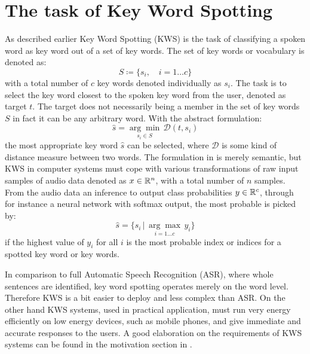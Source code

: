 
\section{The task of Key Word Spotting}\label{sec:intro_kws}
As described earlier Key Word Spotting (KWS) is the task of classifying a spoken word as key word out of a set of key words.
The set of key words or vocabulary is denoted as:
\begin{equation}\label{eq:intro_kws_dict}
	S \coloneqq \{s_i, \quad i=1 \dots c\}
\end{equation}
with a total number of $c$ key words denoted individually as $s_i$.
The task is to select the key word closest to the spoken key word from the user, denoted as target $t$.
The target does not necessarily being a member in the set of key words $S$ in fact it can be any arbitrary word.
With the abstract formulation:
\begin{equation}\label{eq:intro_kws_task}
	\hat{s} = \underset{s_i \in S}{\arg \min} \, \mathcal{D}(t, s_i)
\end{equation}
the most appropriate key word $\hat{s}$ can be selected, where $\mathcal{D}$ is some kind of distance measure between two words.
The formulation in  is merely semantic, but KWS in computer systems must cope with various transformations of raw input samples of audio data denoted as $x \in \mathbb{R}^n$, with a total number of $n$ samples.
From the audio data an inference to output class probabilities $y \in \mathbb{R}^c$, through for instance a neural network with softmax output, the most probable is picked by:
\begin{equation}\label{eq:intro_kws_class}
	\hat{s} = \{s_i \, | \, \underset{i = 1 \dots c}{\arg \max} \, y_i\}
\end{equation}
if the highest value of $y_i$ for all $i$ is the most probable index or indices for a spotted key word or key words.

In comparison to full Automatic Speech Recognition (ASR), where whole sentences are identified, key word spotting operates merely on the word level.
Therefore KWS is a bit easier to deploy and less complex than ASR.
On the other hand KWS systems, used in practical application, must run very energy efficiently on low energy devices, such as mobile phones, and give immediate and accurate responses to the users. 
A good elaboration on the requirements of KWS systems can be found in the motivation section in \cite{Warden2018}.

